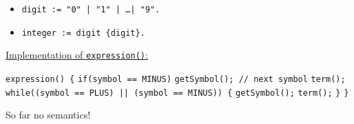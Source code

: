 {{\begin{itemize}
			\item[]{\texttt{digit := "0" | "1" | \ldots | "9".}}
			\item[]{\texttt{integer := digit \{digit\}.}}
		\end{itemize}
	}
	\par{
		\noindent\underline{Implementation of \texttt{expression()}:}
		\par{
			\noindent
			\texttt{expression() \{} \newline
			\indent\texttt{if(symbol == MINUS)} \newline
			\indent\indent\texttt{getSymbol(); // next symbol} \newline
			\indent\texttt{term();} \newline
			\indent\texttt{while((symbol == PLUS) || (symbol == MINUS)) \{} \newline
			\indent\indent\texttt{getSymbol();} \newline
			\indent\indent\texttt{term();} \newline
			\indent\texttt{\}} \newline
			\texttt{\}}
		}
		\par{\noindent So far no semantics!}
	}
}
